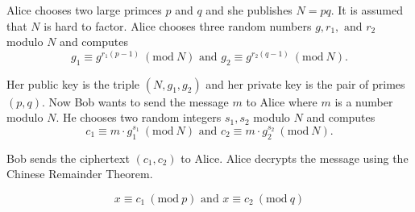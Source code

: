 \documentclass{article}
\newcommand{\Mod}[1]{\ (\mathrm{mod}\ #1)}
\begin{document}
Alice chooses two large primces \(p\) and \(q\) and she publishes \(N = pq\).
It is assumed that \(N\) is hard to factor. Alice chooses three random numbers
\(g, r_1, \text{ and } r_2\) modulo \(N\) and computes
\begin{equation*}
    g_1 \equiv g^{r_1(p-1)} \Mod{N} \text{ and } g_2 \equiv g^{r_2(q-1)} \Mod {N}.
\end{equation*}

Her public key is the triple \((N, g_1, g_2)\) and her private key is the pair of
primes \((p, q)\). Now Bob wants to send the message \(m\) to Alice where \(m\) is
a number modulo \(N\). He chooses two random integers \(s_1, s_2\) modulo \(N\) and computes
\begin{equation*}
    c_1 \equiv m \cdot g_1^{s_1} \Mod{N} \text{ and } c_2 \equiv m \cdot g_2^{s_2} \Mod{N}.
\end{equation*}

Bob sends the ciphertext \((c_1, c_2)\) to Alice. Alice decrypts the message using the
Chinese Remainder Theorem.

\begin{equation*}
    x \equiv c_1 \Mod{p} \text{ and } x\equiv c_2 \Mod{q}
\end{equation*}
\end{document}
